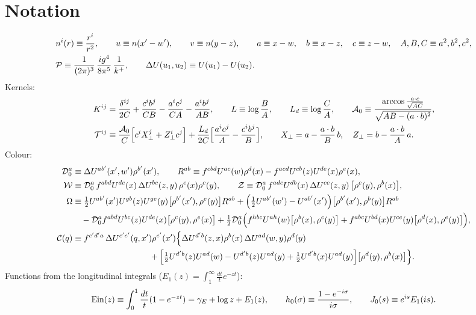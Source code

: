 \documentclass[10pt]{article}
\numberwithin{equation}{section}
\begin{document}
\section{Notation}
\begin{align}
&n^{i}(r)\equiv\frac{r^{i}}{r^{2}},\qquad u\equiv n(x'-w'),\qquad v\equiv n(y-z),\qquad a\equiv x-w,\quad b\equiv x-z,\quad c\equiv z-w,\quad A,B,C\equiv a^{2},b^{2},c^{2},\notag\\
&\mathcal{P}\equiv\frac{1}{(2\pi)^{3}}\,\frac{ig^{4}}{8\pi^{5}}\,\frac{1}{k^{+}},\qquad\Delta U(u_{1},u_{2})\equiv U(u_{1})-U(u_{2}).
\end{align}
Kernels:
\begin{align}
K^{ij}&=\frac{\delta^{ij}}{2C}+\frac{c^{i}b^{j}}{CB}-\frac{a^{i}c^{j}}{CA}-\frac{a^{i}b^{j}}{AB},\qquad L\equiv\log\frac{B}{A},\qquad L_{d}\equiv\log\frac{C}{A},\qquad
\mathcal{A}_{0}\equiv\frac{\arccos\frac{a\cdot c}{\sqrt{AC}}}{\sqrt{AB-(a\cdot b)^{2}}},\notag\\
\mathcal{T}^{ij}&\equiv\frac{\mathcal{A}_{0}}{C}\Big[c^{i}X_{\perp}^{j}+Z_{\perp}^{i}c^{j}\Big]+\frac{L_{d}}{2C}\Big[\frac{a^{i}c^{j}}{A}-\frac{c^{i}b^{j}}{B}\Big],\qquad X_{\perp}=a-\frac{a\cdot b}{B}\,b,\quad Z_{\perp}=b-\frac{a\cdot b}{A}\,a .
\end{align}
Colour:
\begin{align}
\mathcal{D}_{0}^{a}&\equiv\Delta U^{ab'}(x',w')\rho^{b'}(x'),\qquad
R^{ab}\equiv f^{cbd}U^{ac}(w)\rho^{d}(x)-f^{acd}U^{cb}(z)U^{de}(x)\rho^{e}(x),\notag\\
\mathcal{W}&\equiv\mathcal{D}_{0}^{a}\,f^{abd}U^{de}(x)\,\Delta U^{bc}(z,y)\,\rho^{e}(x)\rho^{c}(y),\qquad
\mathcal{Z}\equiv\mathcal{D}_{0}^{a}\,f^{adc}U^{db}(x)\,\Delta U^{ce}(z,y)\,\big[\rho^{e}(y),\rho^{b}(x)\big],\notag\\
\Omega&\equiv\tfrac12U^{ab'}(x')U^{gb}(z)U^{ge}(y)\big[\rho^{b'}(x'),\rho^{e}(y)\big]R^{ab}+\Big(\tfrac12U^{ab'}(w')-U^{ab'}(x')\Big)\big[\rho^{b'}(x'),\rho^{b}(y)\big]R^{ab}\notag\\
&\quad-\mathcal{D}_{0}^{a}f^{abd}U^{bc}(z)U^{de}(x)\big[\rho^{c}(y),\rho^{e}(x)\big]
+\tfrac12\mathcal{D}_{0}^{a}\Big(f^{hbc}U^{ah}(w)\big[\rho^{b}(x),\rho^{c}(y)\big]+f^{abc}U^{bd}(x)U^{ce}(y)\big[\rho^{d}(x),\rho^{e}(y)\big]\Big),\notag\\
\mathcal{C}(q)&\equiv f^{c'd'a}\,\Delta U^{c'e'}(q,x')\rho^{e'}(x')\Big\{\Delta U^{d'b}(z,x)\rho^{b}(x)\,\Delta U^{ad}(w,y)\rho^{d}(y)\notag\\
&\hspace{3.2cm}+\Big[\tfrac12U^{d'b}(z)U^{ad}(w)-U^{d'b}(z)U^{ad}(y)+\tfrac12U^{d'b}(x)U^{ad}(y)\Big]\big[\rho^{d}(y),\rho^{b}(x)\big]\Big\}.
\end{align}
Functions from the longitudinal integrals ($E_{1}(z)=\int_{1}^{\infty}\frac{dt}{t}e^{-zt}$):
\begin{align}
{\rm Ein}(z)\equiv\int_{0}^{1}\frac{dt}{t}(1-e^{-zt})=\gamma_{E}+\log z+E_{1}(z),\qquad h_{0}(\sigma)\equiv\frac{1-e^{-i\sigma}}{i\sigma},\qquad J_{0}(s)\equiv e^{is}E_{1}(is).
\end{align}
\end{document}
